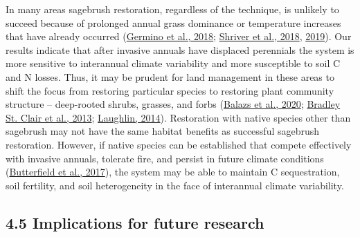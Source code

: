 \documentclass[
  11pt,
  a4paper,
]{article}
\begin{document}
In many areas sagebrush restoration, regardless of the technique, is unlikely to succeed because of prolonged annual grass dominance or temperature increases that have already occurred (\protect\hyperlink{ref-Germino2018}{Germino et al., 2018}; \protect\hyperlink{ref-Shriver2018}{Shriver et al., 2018}, \protect\hyperlink{ref-Shriver2019}{2019}). Our results indicate that after invasive annuals have displaced perennials the system is more sensitive to interannual climate variability and more susceptible to soil C and N losses. Thus, it may be prudent for land management in these areas to shift the focus from restoring particular species to restoring plant community structure -- deep-rooted shrubs, grasses, and forbs (\protect\hyperlink{ref-Balazs2020}{Balazs et al., 2020}; \protect\hyperlink{ref-bradley_st_clair_genetic_2013}{Bradley St. Clair et al., 2013}; \protect\hyperlink{ref-Laughlin2014}{Laughlin, 2014}). Restoration with native species other than sagebrush may not have the same habitat benefits as successful sagebrush restoration. However, if native species can be established that compete effectively with invasive annuals, tolerate fire, and persist in future climate conditions (\protect\hyperlink{ref-Butterfield2017}{Butterfield et al., 2017}), the system may be able to maintain C sequestration, soil fertility, and soil heterogeneity in the face of interannual climate variability.

\hypertarget{implications-for-future-research}{%
\subsection{4.5 Implications for future research}\label{implications-for-future-research}}
\end{document}

